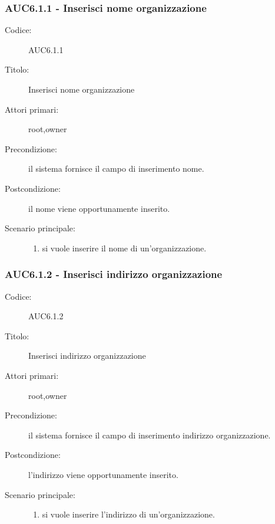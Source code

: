 \documentclass[casi-duso]{subfiles}
\begin{document}
  \subsubsection{AUC6.1.1 - Inserisci nome organizzazione}%
  \label{subsub:AUC6.1.1}
  \begin{description}
    \item[Codice:] AUC6.1.1
    \item[Titolo:] Inserisci nome organizzazione
    \item[Attori primari:] root,owner
    \item[Precondizione:] il sistema fornisce il campo di inserimento nome.
    \item[Postcondizione:] il nome viene opportunamente inserito.
    \item[Scenario principale:] 
    \begin{enumerate}
      \item si vuole inserire il nome di un'organizzazione.
    \end{enumerate}
    
  \end{description}
  
  \subsubsection{AUC6.1.2 - Inserisci indirizzo organizzazione}%
  \label{subsub:AUC6.1.2}
  \begin{description}
    \item[Codice:] AUC6.1.2
    \item[Titolo:] Inserisci indirizzo organizzazione
    \item[Attori primari:] root,owner
    \item[Precondizione:] il sistema fornisce il campo di inserimento indirizzo organizzazione.
    \item[Postcondizione:] l'indirizzo viene opportunamente inserito.
    \item[Scenario principale:]
    \begin{enumerate}
      \item si vuole inserire l'indirizzo di un'organizzazione.
    \end{enumerate}
  \end{description}
  
\end{document}
